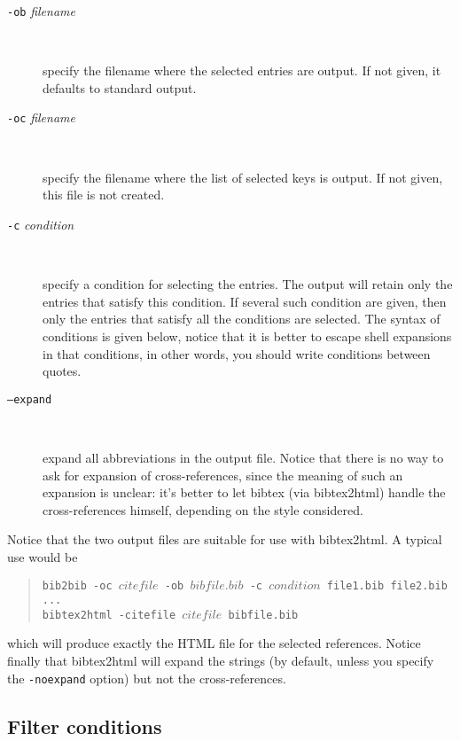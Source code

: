 \documentclass[11pt,a4paper]{article}
\begin{document}
\begin{description}
  
\item[\texttt{-ob} \textit{filename}] ~

  specify the filename where the selected entries are output. If not
  given, it defaults to standard output. 

\item[\texttt{-oc} \textit{filename}] ~

  specify the filename where the list of selected keys is output. If
  not given, this file is not created.

\item[\texttt{-c} \textit{condition}] ~

  specify a condition for selecting the entries. The output will
  retain only the entries that satisfy this condition. If several such
  condition are given, then only the entries that satisfy all the
  conditions are selected. The syntax of conditions is given below,
  notice that it is better to escape shell expansions in that
  conditions, in other words, you should write conditions between
  quotes. 

\item[\texttt{--expand}] ~

  expand all abbreviations in the output file. Notice that there is no
  way to ask for expansion of cross-references, since the meaning of
  such an expansion is unclear: it's better to let bibtex (via
  bibtex2html) handle the cross-references himself, depending on the
  style considered.

\end{description}

Notice that the two output files are suitable for use with
bibtex2html.  A typical use would be
\begin{quote}
\texttt{bib2bib -oc $citefile$ -ob $bibfile.bib$ -c $condition$
  file1.bib file2.bib ... } \\
\texttt{bibtex2html -citefile $citefile$ bibfile.bib}
\end{quote}
which will produce exactly the HTML file for the selected
references. Notice finally that bibtex2html will expand the strings
(by default, unless you specify the \verb|-noexpand| option) but not
the cross-references.

\subsection{Filter conditions}
\end{document}
